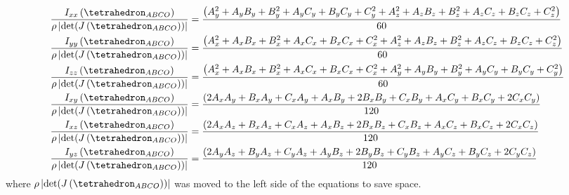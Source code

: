 \documentclass[oneside, a4paper]{book}
\newcommand\abs[1]{\left|#1\right|}
\newcommand\br[1]{\left(#1\right)}
\begin{document}
\begin{appendices}
  \begin{align}
    \frac{I_{xx}\br{\tetrahedron_{ABCO}}}{\rho \abs{\det(J\br{\tetrahedron_{ABCO}})} } &= \frac{\br{
      A_y^2 + A_yB_y+B_y^2 + A_yC_y + B_yC_y + C_y^2 + 
      A_z^2 + A_zB_z+B_z^2 + A_zC_z + B_zC_z + C_z^2
    }}{60}\\
    \frac{I_{yy}\br{\tetrahedron_{ABCO}}}{\rho \abs{\det(J\br{\tetrahedron_{ABCO}})} } &= \frac{\br{
      A_x^2 + A_xB_x+B_x^2 + A_xC_x + B_xC_x + C_x^2 + 
      A_z^2 + A_zB_z+B_z^2 + A_zC_z + B_zC_z + C_z^2
    }}{60}\\
    \frac{I_{zz}\br{\tetrahedron_{ABCO}}}{\rho \abs{\det(J\br{\tetrahedron_{ABCO}})} } &= \frac{\br{
      A_x^2 + A_xB_x+B_x^2 + A_xC_x + B_xC_x + C_x^2 + 
      A_y^2 + A_yB_y+B_y^2 + A_yC_y + B_yC_y + C_y^2
    }}{60}\\
    \frac{I_{xy}\br{\tetrahedron_{ABCO}}}{\rho \abs{\det(J\br{\tetrahedron_{ABCO}})} } &= \frac{\br{
      2A_xA_y + B_xA_y + C_xA_y + A_xB_y + 
      2B_xB_y + C_xB_y + A_xC_y + B_xC_y + 
      2C_xC_y 
    }}{120}\\
    \frac{I_{xz}\br{\tetrahedron_{ABCO}}}{\rho \abs{\det(J\br{\tetrahedron_{ABCO}})} } &= \frac{\br{
      2A_xA_z + B_xA_z + C_xA_z + A_xB_z + 
      2B_xB_z + C_xB_z + A_xC_z + B_xC_z + 
      2C_xC_z 
    }}{120}\\
    \frac{I_{yz}\br{\tetrahedron_{ABCO}}}{\rho \abs{\det(J\br{\tetrahedron_{ABCO}})} } &= \frac{\br{
      2A_yA_z + B_yA_z + C_yA_z + A_yB_z + 
      2B_yB_z + C_yB_z + A_yC_z + B_yC_z + 
      2C_yC_z 
    }}{120}
  \end{align}
  where $\rho \abs{\det(J\br{\tetrahedron_{ABCO}})} $ was moved to the left side of the equations to save space. 
  

\end{appendices}
\end{document}
